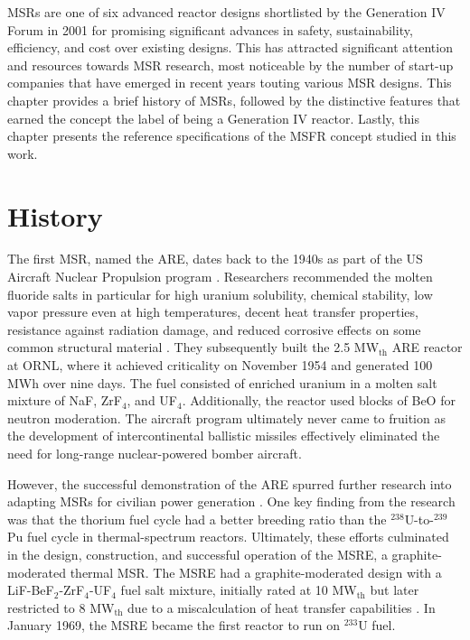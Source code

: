 \glspl{MSR} are one of six advanced reactor designs shortlisted by
the Generation IV Forum in 2001 for promising significant advances in safety,
sustainability, efficiency, and cost over existing designs. This
has attracted significant attention and resources towards
\gls{MSR} research, most noticeable by the number of start-up companies that
have emerged in recent years touting various \gls{MSR} designs. This chapter
provides a brief history of \glspl{MSR}, followed by the distinctive features
that earned the concept the label of being a Generation IV reactor. Lastly,
this chapter presents the reference specifications of the \gls{MSFR} concept
studied in this work.

\section{History}

The first \gls{MSR}, named the \gls{ARE}, dates back to the 1940s
as part of the US Aircraft Nuclear Propulsion program
\cite{rosenthal_molten-salt_1970}. Researchers recommended the molten fluoride
salts in particular for high uranium solubility, chemical stability, low vapor
pressure even at high temperatures, decent heat transfer properties,
resistance against radiation damage, and reduced corrosive effects on some
common structural material \cite{rosenthal_molten-salt_1970}. They
subsequently built the 2.5 MW$_{\text{th}}$ ARE reactor at \gls{ORNL}, where
it achieved criticality on November 1954 and generated 100 MWh over nine days.
The fuel consisted of enriched uranium in a molten salt mixture of NaF,
ZrF$_4$, and UF$_4$. Additionally, the reactor used blocks of BeO for neutron
moderation. The aircraft program
ultimately never came to fruition as the development of intercontinental
ballistic missiles effectively eliminated the need for long-range
nuclear-powered bomber aircraft.

However, the successful demonstration of the \gls{ARE} spurred further
research into adapting \glspl{MSR} for civilian power generation
\cite{rosenthal_molten-salt_1970}. One key finding from the
research was that the thorium fuel cycle had a better breeding ratio than the
$^{238}$U-to-$^{239}$Pu fuel cycle in thermal-spectrum reactors.
Ultimately, these efforts culminated in the design, construction, and
successful operation of the \gls{MSRE}, a graphite-moderated thermal
\gls{MSR}. The \gls{MSRE} had a
graphite-moderated design with a LiF-BeF$_2$-ZrF$_4$-UF$_4$ fuel salt mixture,
initially rated at 10 MW$_{\text{th}}$ but later restricted to 8
MW$_{\text{th}}$ due to a miscalculation of heat transfer capabilities
\cite{haubenreich_experience_1970}. In January 1969, the \gls{MSRE} became the
first reactor to run on $^{233}$U fuel.

